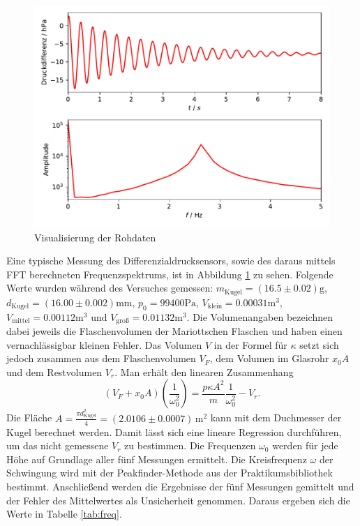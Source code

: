 \documentclass[a4paper, 12pt]{scrartcl}
\begin{document}
\begin{figure}[H]
\centering
\includegraphics[width=\textwidth]{plots/rohdaten_log.pdf}
\caption{Visualisierung der Rohdaten}
\label{rohdaten}
\end{figure}
Eine typische Messung des Differenzialdrucksensors, sowie des daraus mittels FFT berechneten Frequenzspektrums, ist in Abbildung \ref{rohdaten} zu sehen.
Folgende Werte wurden während des Versuches gemessen: $m_{\text{Kugel}} = (16.5\pm 0.02)\text{g}$, $d_{\text{Kugel}} = (16.00 \pm 0.002)\text{mm}$, $p_0 = 99400\text{Pa}$, $V_{\text{klein}} = 0.00031\text{m}^3$, $V_{\text{mittel}} = 0.00112 \text{m}^3$ und $V_{\text{groß}} = 0.01132 \text{m}^3$. Die Volumenangaben bezeichnen dabei jeweils die Flaschenvolumen der Mariottschen Flaschen und haben einen vernachlässigbar kleinen Fehler. Das Volumen $V$ in der Formel für $\kappa$ setzt sich jedoch zusammen aus dem Flaschenvolumen $V_F$, dem Volumen im Glasrohr $x_0A$ und dem Restvolumen $V_r$. Man erhält den linearen Zusammenhang
$$(V_F+x_0A)\left( \frac 1{\omega_0^2}\right) = \frac{p\kappa A^2}m \frac 1{\omega_0^2} - V_r.$$
Die Fläche $A = \frac{\pi d_{\text{Kugel}}^2}{4} = (2.0106 \pm 0.0007)\,\text{m}^2$ kann mit dem Duchmesser der Kugel berechnet werden. Damit lässt sich eine lineare Regression durchführen, um das nicht gemessene $V_r$ zu bestimmen. Die Frequenzen $\omega_0$ werden für jede Höhe auf Grundlage aller fünf Messungen ermittelt. Die Kreisfrequenz $\omega$ der Schwingung wird mit der Peakfinder-Methode aus der Praktikumsbibliothek bestimmt. Anschließend werden die Ergebnisse der fünf Messungen gemittelt und der Fehler des Mittelwertes als Unsicherheit genommen. Daraus ergeben sich die Werte in Tabelle \ref{tab:freq}.
\end{document}
